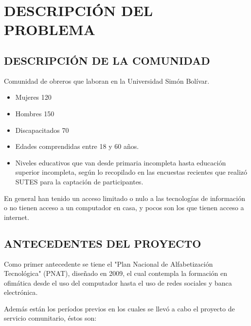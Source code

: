 	\chapter{DESCRIPCIÓN DEL PROBLEMA}
    
		\section{DESCRIPCIÓN DE LA COMUNIDAD}
			Comunidad de obreros que laboran en la Universidad Simón Bolívar. \cite{planSC}
            \begin{itemize}
                \item Mujeres 120
                \item Hombres 150
                \item Discapacitados 70
                \item Edades comprendidas entre 18 y 60 años. 
                \item Niveles educativos que van desde primaria incompleta hasta educación superior incompleta, según lo recopilado en las encuestas recientes que realizó SUTES para la captación de participantes.
            \end{itemize}
            
            En general han tenido un acceso limitado o nulo a las tecnologías de información o no tienen acceso a un computador en casa, y pocos son los que tienen acceso a internet.
            
		\section{ANTECEDENTES DEL PROYECTO}
            Como primer antecedente se tiene el "Plan Nacional de Alfabetización Tecnológica" (PNAT)\cite{PNAT}, diseñado en 2009, el cual contempla la formación en ofimática desde el  uso del computador hasta el uso de redes sociales y banca electrónica\cite{infocentro}.
            
            Además están los períodos previos en los cuales se llevó a cabo el proyecto de servicio comunitario, éstos son:
            
